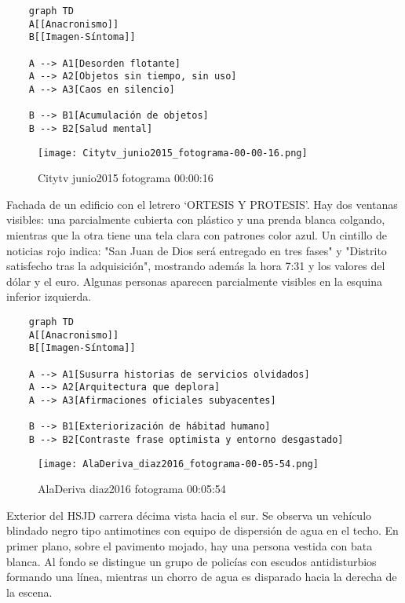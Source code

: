 {\small
\singlespacing \begin{verbatim}
    graph TD
    A[[Anacronismo]]
    B[[Imagen-Síntoma]]

    A --> A1[Desorden flotante]
    A --> A2[Objetos sin tiempo, sin uso]
    A --> A3[Caos en silencio]

    B --> B1[Acumulación de objetos]
    B --> B2[Salud mental]
\end{verbatim}
\normalsize

\clearpage
\begin{figure}[h!]
    \centering
    \texttt{[image: Citytv\_junio2015\_fotograma-00-00-16.png]}
    \caption{Citytv junio2015 fotograma 00:00:16}
    \label{fig:Citytv_junio2015_fotograma_00_00_16}
\end{figure}

Fachada de un edificio con el letrero `ORTESIS Y PROTESIS'. Hay dos ventanas visibles: una parcialmente cubierta con plástico y una prenda blanca colgando, mientras que la otra tiene una tela clara con patrones color azul. Un cintillo de noticias rojo indica: "San Juan de Dios será entregado en tres fases" y "Distrito satisfecho tras la adquisición", mostrando además la hora 7:31 y los valores del dólar y el euro. Algunas personas aparecen parcialmente visibles en la esquina inferior izquierda. \parencite[fotograma: 00:00:16]{CitytvJunio2015}

\small
\singlespacing \begin{verbatim}
    graph TD
    A[[Anacronismo]]
    B[[Imagen-Síntoma]]
    
    A --> A1[Susurra historias de servicios olvidados]
    A --> A2[Arquitectura que deplora]
    A --> A3[Afirmaciones oficiales subyacentes]
    
    B --> B1[Exteriorización de hábitad humano]
    B --> B2[Contraste frase optimista y entorno desgastado]
\end{verbatim}
\normalsize

\clearpage
\begin{figure}[h!]
    \centering
    \texttt{[image: AlaDeriva\_diaz2016\_fotograma-00-05-54.png]}
    \caption{AlaDeriva diaz2016 fotograma 00:05:54}
    \label{fig:AlaDeriva_diaz2016_fotograma_00_05_54}
\end{figure}

Exterior del HSJD carrera décima vista hacia el sur. Se observa un vehículo blindado negro tipo antimotines con equipo de dispersión de agua en el techo. En primer plano, sobre el pavimento mojado, hay una persona vestida con bata blanca. Al fondo se distingue un grupo de policías con escudos antidisturbios formando una línea, mientras un chorro de agua es disparado hacia la derecha de la escena. \parencite[fotograma: 00:05:54]{AlaDerivaDiaz2016}

}
